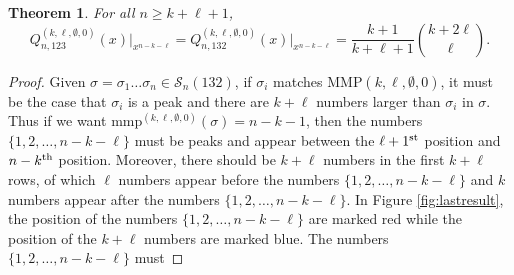 \documentclass[
final,nomarks
]{dmtcs-episciences}
\newtheorem{theorem}{Theorem}
\newcommand{\fref}[1]{Figure \ref{fig:#1}}
\newcommand{\Sn}[1]{\mathcal{S}_{#1}}
\newcommand{\Qmmn}[2]{Q_{#2,132}^{(#1)}(x)}
\newcommand{\Qmn}[2]{Q_{#2,123}^{(#1)}(x)}
\newcommand{\MMP}{\mathrm{MMP}}
\newcommand{\mmp}{\mathrm{mmp}}
\newcommand{\thn}[1]{\begin{math}#1^\textnormal{th}\end{math}}
\begin{document}
\begin{theorem}\label{theorem:004} For all \begin{math}n \geq k + \ell +1\end{math}, 
\begin{equation}
\Qmn{k,\ell,\emptyset,0}{n}\big\vert_{x^{n-k-\ell}}=\Qmmn{k,\ell,\emptyset,0}{n}\big\vert_{x^{n-k-\ell}}=\frac{k+1}{k+\ell+1}\binom{k+2\ell}{\ell}.
\end{equation}
\end{theorem}
\begin{proof}
	Given \begin{math}\sigma = \sigma_1 \ldots \sigma_n \in \Sn{n}(132)\end{math}, if \begin{math}\sigma_i\end{math} matches 
	\begin{math}\MMP(k,\ell,\emptyset,0)\end{math}, it must be the case that \begin{math}\sigma_i\end{math} is a peak and there are  \begin{math}k+\ell\end{math} numbers larger than \begin{math}\sigma_i\end{math} in \begin{math}\sigma\end{math}. Thus if 
	we want \begin{math}\mmp^{(k,\ell,\emptyset,0)}(\sigma) = n-k-1\end{math}, then 
	the numbers \begin{math}\{1,2,\ldots,n-k-\ell\}\end{math} must be peaks and appear between the \begin{math}\ell+1^{\textnormal{st}}\end{math} position and \thn{n-k} position. Moreover, there should be \begin{math}k+\ell\end{math} numbers in the first \begin{math}k+\ell\end{math} rows, of which \begin{math}\ell\end{math} numbers appear before the numbers \begin{math}\{1,2,\ldots,n-k-\ell\}\end{math} and \begin{math}k\end{math} numbers appear after the numbers \begin{math}\{1,2,\ldots,n-k-\ell\}\end{math}. In \fref{lastresult}, the position of the numbers \begin{math}\{1,2,\ldots,n-k-\ell\}\end{math} are marked red while the position of the \begin{math}k+\ell\end{math} numbers are marked blue. The numbers \begin{math}\{1,2,\ldots,n-k-\ell\}\end{math} must 

\end{proof}
\end{document}
